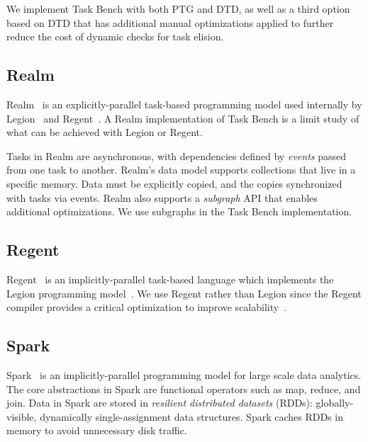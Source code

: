 We implement Task Bench with both PTG and DTD, as well as a third
option based on DTD that has additional manual optimizations applied
to further reduce the cost of dynamic checks for task elision.


\subsection{Realm}

Realm~\cite{Realm14} is an explicitly-parallel task-based programming
model used internally by Legion~\cite{Legion12} and
Regent~\cite{Regent15}. A Realm implementation of Task Bench is a limit study of what can be achieved with Legion or Regent.

Tasks in Realm are asynchronous, with dependencies
defined by \emph{events} passed from one task
to another. Realm's data model supports collections that live in a
specific memory. Data must be explicitly copied, and the copies
synchronized with tasks via events.
Realm also supports a \emph{subgraph} API that enables additional
optimizations. We use subgraphs in the Task
Bench implementation.

\subsection{Regent}

Regent~\cite{Regent15} is an implicitly-parallel task-based language
which implements the Legion programming model~\cite{Legion12}. We use
Regent rather than Legion since the Regent compiler
provides a critical optimization to
improve scalability~\cite{ControlReplication17}.

\subsection{Spark}

Spark~\cite{Spark10} is an implicitly-parallel programming model for
large scale data analytics.
The core abstractions in Spark are functional operators such as map,
reduce, and join. Data in Spark are stored in
\emph{resilient
  distributed datasets} (RDDs): globally-visible,
dynamically single-assignment data structures. Spark caches RDDs in memory to avoid unnecessary
disk traffic.

